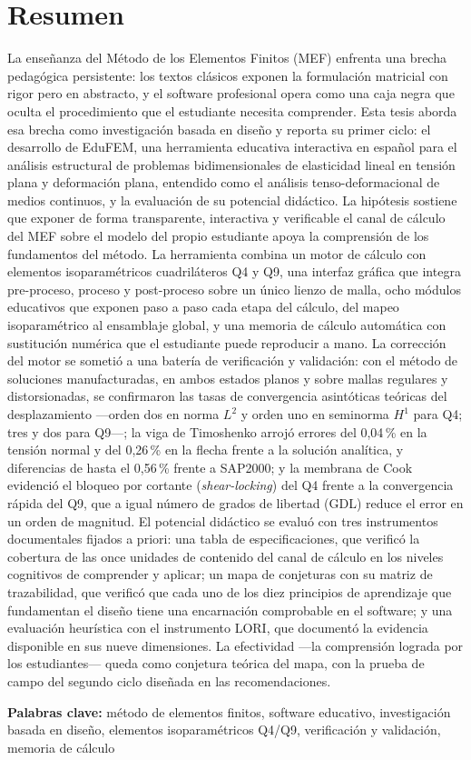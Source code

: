 \chapter*{Resumen}

La enseñanza del Método de los Elementos Finitos (MEF) enfrenta una brecha pedagógica persistente: los textos clásicos exponen la formulación matricial con rigor pero en abstracto, y el software profesional opera como una caja negra que oculta el procedimiento que el estudiante necesita comprender. Esta tesis aborda esa brecha como investigación basada en diseño y reporta su primer ciclo: el desarrollo de EduFEM, una herramienta educativa interactiva en español para el análisis estructural de problemas bidimensionales de elasticidad lineal en tensión plana y deformación plana, entendido como el análisis tenso-deformacional de medios continuos, y la evaluación de su potencial didáctico. La hipótesis sostiene que exponer de forma transparente, interactiva y verificable el canal de cálculo del MEF sobre el modelo del propio estudiante apoya la comprensión de los fundamentos del método. La herramienta combina un motor de cálculo con elementos isoparamétricos cuadriláteros Q4 y Q9, una interfaz gráfica que integra pre-proceso, proceso y post-proceso sobre un único lienzo de malla, ocho módulos educativos que exponen paso a paso cada etapa del cálculo, del mapeo isoparamétrico al ensamblaje global, y una memoria de cálculo automática con sustitución numérica que el estudiante puede reproducir a mano. La corrección del motor se sometió a una batería de verificación y validación: con el método de soluciones manufacturadas, en ambos estados planos y sobre mallas regulares y distorsionadas, se confirmaron las tasas de convergencia asintóticas teóricas del desplazamiento —orden dos en norma $L^2$ y orden uno en seminorma $H^1$ para Q4; tres y dos para Q9—; la viga de Timoshenko arrojó errores del 0,04\,\% en la tensión normal y del 0,26\,\% en la flecha frente a la solución analítica, y diferencias de hasta el 0,56\,\% frente a SAP2000; y la membrana de Cook evidenció el bloqueo por cortante (\emph{shear-locking}) del Q4 frente a la convergencia rápida del Q9, que a igual número de grados de libertad (GDL) reduce el error en un orden de magnitud. El potencial didáctico se evaluó con tres instrumentos documentales fijados a priori: una tabla de especificaciones, que verificó la cobertura de las once unidades de contenido del canal de cálculo en los niveles cognitivos de comprender y aplicar; un mapa de conjeturas con su matriz de trazabilidad, que verificó que cada uno de los diez principios de aprendizaje que fundamentan el diseño tiene una encarnación comprobable en el software; y una evaluación heurística con el instrumento LORI, que documentó la evidencia disponible en sus nueve dimensiones. La efectividad —la comprensión lograda por los estudiantes— queda como conjetura teórica del mapa, con la prueba de campo del segundo ciclo diseñada en las recomendaciones.

\noindent\textbf{Palabras clave:} método de elementos finitos, software educativo, investigación basada en diseño, elementos isoparamétricos Q4/Q9, verificación y validación, memoria de cálculo
